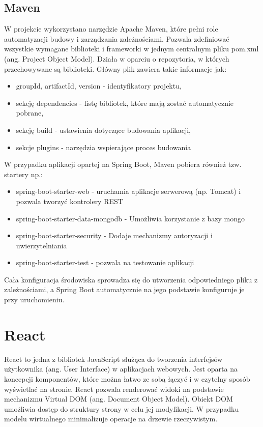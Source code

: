 \subsection*{Maven}
W projekcie wykorzystano narzędzie Apache Maven, które pełni role automatyzacji budowy i zarządzania zależnościami. Pozwala zdefiniować wszystkie wymagane biblioteki i frameworki w jednym centralnym pliku pom.xml (ang. Project Object Model). Działa w oparciu o repozytoria, w których przechowywane są biblioteki. Główny plik zawiera takie informacje jak:
\begin{itemize}
	\item groupId, artifactId, version - identyfikatory projektu,
	\item sekcję dependencies - listę bibliotek, które mają zostać automatycznie pobrane,
	\item sekcję build - ustawienia dotyczące budowania aplikacji,
	\item sekcje plugins - narzędzia wspierające proces budowania
\end{itemize}
W przypadku aplikacji opartej na Spring Boot, Maven pobiera również tzw. startery np.:
\begin{itemize}
	\item spring-boot-starter-web - uruchamia aplikacje serwerową (np. Tomcat) i pozwala tworzyć kontrolery REST
	\item spring-boot-starter-data-mongodb - Umożliwia korzystanie z bazy mongo
	\item spring-boot-starter-security - Dodaje mechanizmy autoryzacji i uwierzytelniania
	\item spring-boot-starter-test - pozwala na testowanie aplikacji
\end{itemize}
Cała konfiguracja środowiska sprowadza się do utworzenia odpowiedniego pliku z zależnościami, a Spring Boot automatycznie na jego podstawie konfiguruje je przy uruchomieniu.

\section{React}
React to jedna z bibliotek JavaScript służąca do tworzenia interfejsów użytkownika (ang. User Interface) w aplikacjach webowych. Jest oparta na koncepcji komponentów, które można łatwo ze sobą łączyć i w czytelny sposób wyświetlać na stronie. React pozwala renderować widoki na podstawie mechanizmu Virtual DOM (ang. Document Object Model). Obiekt DOM umożliwia dostęp do struktury strony w celu jej modyfikacji. W przypadku modelu wirtualnego minimalizuje operacje na drzewie rzeczywistym. 
